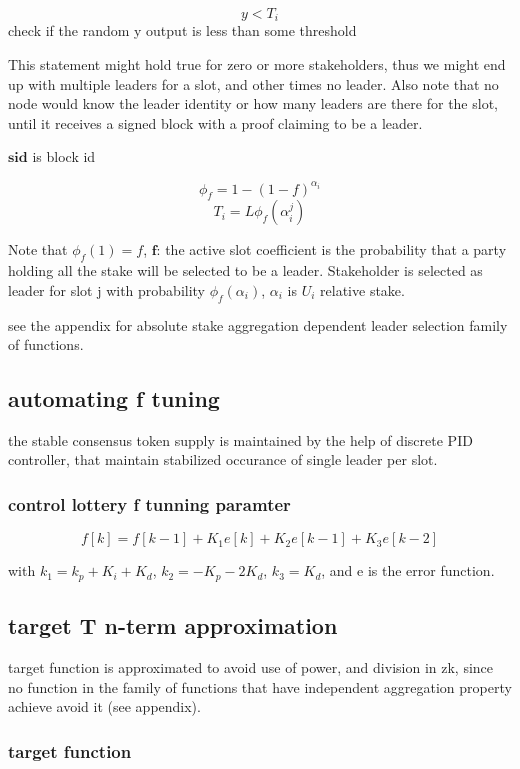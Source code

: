 \documentclass{article}
\begin{document}
$$y < T_{i}$$ check if the random y output is less than some
threshold

This statement might hold true for zero or more stakeholders, thus
we might end up with multiple leaders for a slot, and other times no
leader. Also note that no node would know the leader identity or how many
leaders are there for the slot, until it receives a signed block with
a proof claiming to be a leader.


$\textbf{sid}$ is block id

$$\phi_{f} = 1 - (1-f)^{\alpha_i}$$ $$T_{i} =
L \phi_{f}(\alpha_i^j)$$

Note that $\phi_f(1)=f$, $\textbf{f}$: the active slot coefficient is
the probability that a party holding all the stake will be selected to be
a leader. Stakeholder is selected as leader for slot j with probability
$\phi_f(\alpha_i)$, $\alpha_i$ is $U_i$ relative stake.

see the appendix for absolute stake aggregation dependent leader selection
family of functions.

\subsection{ automating f tuning}

the stable consensus token supply is maintained by the help of discrete PID controller, that maintain stabilized occurance of single leader per slot.

\subsubsection{ control lottery f tunning paramter }

$$f[k] = f[k-1] + K_1e[k] + K_2e[k-1] + K_3e[k-2]$$

with $k_1 = k_p + K_i + K_d$,  $k_2 = -K_p -2K_d$,  $k_3 = K_d$, and e is the error function.


\subsection{ target T n-term approximation }
target function is approximated to avoid use of power, and division in zk, since no function in the family of functions that have independent aggregation property achieve avoid it (see appendix).

\subsubsection{ target function}
\end{document}
